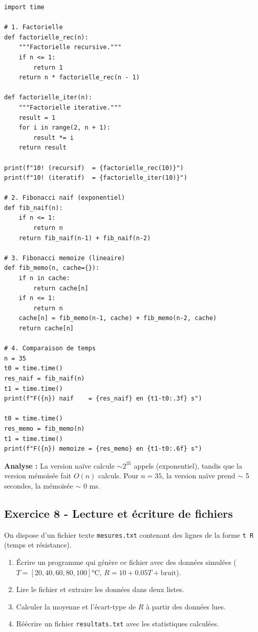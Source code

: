 \documentclass[12pt,a4paper]{article}
\begin{document}
\begin{boitecorrige}
\begin{lstlisting}
import time

# 1. Factorielle
def factorielle_rec(n):
    """Factorielle recursive."""
    if n <= 1:
        return 1
    return n * factorielle_rec(n - 1)

def factorielle_iter(n):
    """Factorielle iterative."""
    result = 1
    for i in range(2, n + 1):
        result *= i
    return result

print(f"10! (recursif)  = {factorielle_rec(10)}")
print(f"10! (iteratif)  = {factorielle_iter(10)}")

# 2. Fibonacci naif (exponentiel)
def fib_naif(n):
    if n <= 1:
        return n
    return fib_naif(n-1) + fib_naif(n-2)

# 3. Fibonacci memoize (lineaire)
def fib_memo(n, cache={}):
    if n in cache:
        return cache[n]
    if n <= 1:
        return n
    cache[n] = fib_memo(n-1, cache) + fib_memo(n-2, cache)
    return cache[n]

# 4. Comparaison de temps
n = 35
t0 = time.time()
res_naif = fib_naif(n)
t1 = time.time()
print(f"F({n}) naif    = {res_naif} en {t1-t0:.3f} s")

t0 = time.time()
res_memo = fib_memo(n)
t1 = time.time()
print(f"F({n}) memoize = {res_memo} en {t1-t0:.6f} s")
\end{lstlisting}

\textbf{Analyse :} La version naïve calcule $\sim 2^{35}$ appels (exponentiel), tandis que la version mémoïsée fait $O(n)$ calculs. Pour $n=35$, la version naïve prend $\sim$ 5 secondes, la mémoïsée $\sim$ 0 ms.
\end{boitecorrige}

\subsection*{Exercice 8 - Lecture et écriture de fichiers \niveau{\facile}}

\begin{boiteexercice}
On dispose d'un fichier texte \texttt{mesures.txt} contenant des lignes de la forme \texttt{t R} (temps et résistance).
\begin{enumerate}
  \item Écrire un programme qui génère ce fichier avec des données simulées ($T = [20, 40, 60, 80, 100]$°C, $R = 10 + 0.05T + \text{bruit}$).
  \item Lire le fichier et extraire les données dans deux listes.
  \item Calculer la moyenne et l'écart-type de $R$ à partir des données lues.
  \item Réécrire un fichier \texttt{resultats.txt} avec les statistiques calculées.
\end{enumerate}
\end{boiteexercice}
\end{document}
